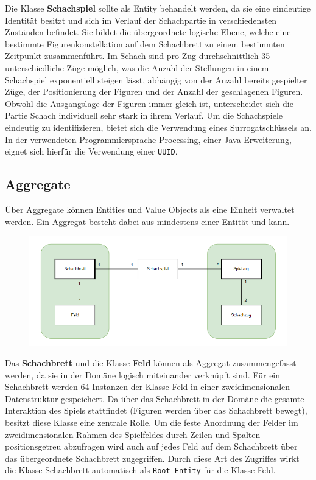 Die Klasse \textbf{Schachspiel} sollte als Entity behandelt werden, da sie eine eindeutige Identität besitzt und sich im Verlauf der Schachpartie in verschiedensten Zuständen befindet. 
Sie bildet die übergeordnete logische Ebene, welche eine bestimmte Figurenkonstellation auf dem Schachbrett zu einem bestimmten Zeitpunkt zusammenführt. 
Im Schach sind pro Zug durchschnittlich 35 unterschiedliche Züge möglich, was die Anzahl der Stellungen in einem Schachspiel exponentiell steigen lässt, abhängig von der Anzahl bereits gespielter Züge, der Positionierung der Figuren und der Anzahl der geschlagenen Figuren. 
Obwohl die Ausgangslage der Figuren immer gleich ist, unterscheidet sich die Partie Schach individuell sehr stark in ihrem Verlauf.
Um die Schachspiele eindeutig zu identifizieren, bietet sich die Verwendung eines Surrogatschlüssels an.
In der verwendeten Programmiersprache Processing, einer Java-Erweiterung, eignet sich hierfür die Verwendung einer \texttt{UUID}.

\subsection*{Aggregate}

Über Aggregate können Entities und Value Objects als eine Einheit verwaltet werden. 
Ein Aggregat besteht dabei aus mindestens einer Entität und kann.

\begin{figure}[ht!]
    \centering
    \includegraphics*[scale=0.73]{Bilder/DDD_Aggregate.PNG}
\end{figure}

Das \textbf{Schachbrett} und die Klasse \textbf{Feld} können als Aggregat zusammengefasst werden, da sie in der Domäne logisch miteinander verknüpft sind. 
Für ein Schachbrett werden 64 Instanzen der Klasse Feld in einer zweidimensionalen Datenstruktur gespeichert. 
Da über das Schachbrett in der Domäne die gesamte Interaktion des Spiels stattfindet (Figuren werden über das Schachbrett bewegt), besitzt diese Klasse eine zentrale Rolle. 
Um die feste Anordnung der Felder im zweidimensionalen Rahmen des Spielfeldes durch Zeilen und Spalten positionsgetreu abzufragen wird auch auf jedes Feld auf dem Schachbrett über das übergeordnete Schachbrett zugegriffen.
Durch diese Art des Zugriffes wirkt die Klasse Schachbrett automatisch als \texttt{Root-Entity} für die Klasse Feld. 


